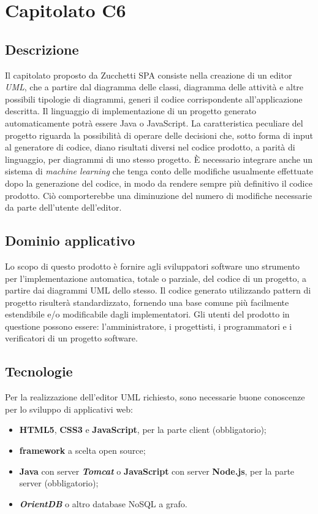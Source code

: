 \newpage
\section{Capitolato C6}

\subsection{Descrizione}

Il capitolato proposto da Zucchetti SPA consiste nella creazione di un editor \textit{UML}, che a partire dal diagramma delle classi, diagramma delle attività e altre possibili tipologie di diagrammi, generi il codice corrispondente all'applicazione descritta. Il linguaggio di implementazione di un progetto generato automaticamente potrà essere Java o JavaScript. La caratteristica peculiare del progetto riguarda la possibilità di operare delle decisioni che, sotto forma di input al generatore di codice, diano risultati diversi nel codice prodotto, a parità di linguaggio, per diagrammi di uno stesso progetto. {\MakeUppercase{è}} necessario integrare anche un sistema di \textit{machine learning} che tenga conto delle modifiche usualmente effettuate dopo la generazione del codice, in modo da rendere sempre più definitivo il codice prodotto. Ciò comporterebbe una diminuzione del numero di modifiche necessarie da parte dell'utente dell'editor.

\subsection{Dominio applicativo}

Lo scopo di questo prodotto è fornire agli sviluppatori software uno strumento per l'implementazione automatica, totale o parziale, del codice di un progetto, a partire dai diagrammi UML dello stesso. Il codice generato utilizzando pattern di progetto risulterà standardizzato,
fornendo una base comune più facilmente estendibile e/o modificabile dagli implementatori. Gli utenti del prodotto in questione possono essere: l'amministratore, i progettisti, i programmatori e i verificatori di un progetto software.

\subsection{Tecnologie}

Per la realizzazione dell'editor UML richiesto, sono necessarie buone conoscenze per lo sviluppo di applicativi web:
\begin{itemize}
	\item \textbf{HTML5}, \textbf{CSS3} e \textbf{JavaScript}, per la parte client (obbligatorio);
	\item \textbf{framework} a scelta open source;
	\item \textbf{Java} con server \textbf{\textit{Tomcat}} o \textbf{JavaScript} con server \textbf{Node.js}, per la parte server	(obbligatorio);
	\item \textbf{\textit{OrientDB}} o altro database NoSQL a grafo.
\end{itemize}

